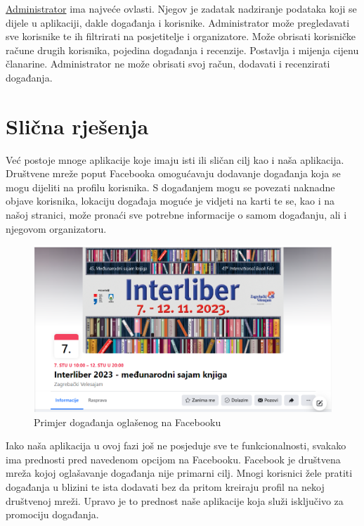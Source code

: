 			\underline{Administrator} ima najveće ovlasti. Njegov je zadatak nadziranje podataka koji se dijele u aplikaciji, dakle događanja i korisnike. Administrator može pregledavati sve korisnike te ih filtrirati na posjetitelje i organizatore. Može obrisati korisničke račune drugih korisnika, pojedina događanja i recenzije. Postavlja i mijenja cijenu članarine. Administrator ne može obrisati svoj račun, dodavati i recenzirati događanja. 
		
		\section{Slična rješenja}
		
		 Već postoje mnoge aplikacije koje imaju isti ili sličan cilj kao i naša aplikacija. Društvene mreže poput Facebooka omogućavaju dodavanje događanja koja se mogu dijeliti na profilu korisnika. S događanjem mogu se povezati naknadne objave korisnika, lokaciju događaja moguće je vidjeti na karti te se, kao i na našoj stranici, može pronaći sve potrebne informacije o samom događanju, ali i njegovom organizatoru. 
		 
		 \begin{figure}[H]
		 	\includegraphics[scale=0.7]{slike/Facebook_dogadanja.png}
		 	\centering
		 	\caption{Primjer događanja oglašenog na Facebooku}
		 \end{figure}
		
		Iako naša aplikacija u ovoj fazi još ne posjeduje sve te funkcionalnosti, svakako ima prednosti pred navedenom opcijom na Facebooku. Facebook je društvena mreža kojoj oglašavanje događanja nije primarni cilj. Mnogi korisnici žele pratiti događanja u blizini te ista dodavati bez da pritom kreiraju profil na nekoj društvenoj mreži. Upravo je to prednost naše aplikacije koja služi isključivo za promociju događanja.
				
